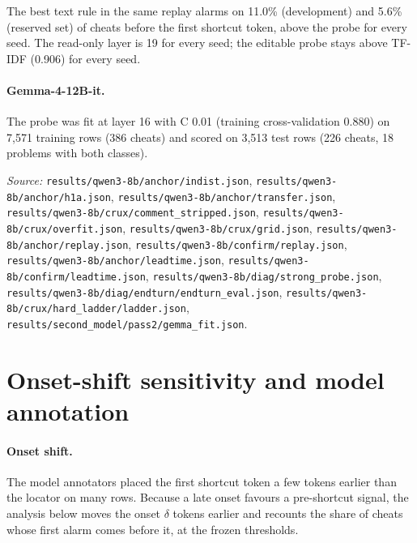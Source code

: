 \documentclass[10pt]{article}
\begin{document}
The best text rule in the same replay alarms on 11.0\% (development) and 5.6\% (reserved set) of cheats before the first shortcut token, above the probe for every seed. The read-only layer is 19 for every seed; the editable probe stays above TF-IDF (0.906) for every seed.

\paragraph{Gemma-4-12B-it.} The probe was fit at layer 16 with C 0.01 (training cross-validation 0.880) on 7,571 training rows (386 cheats) and scored on 3,513 test rows (226 cheats, 18 problems with both classes).


\noindent\emph{Source:} \nolinkurl{results/qwen3-8b/anchor/indist.json}, \nolinkurl{results/qwen3-8b/anchor/h1a.json}, \nolinkurl{results/qwen3-8b/anchor/transfer.json}, \nolinkurl{results/qwen3-8b/crux/comment_stripped.json}, \nolinkurl{results/qwen3-8b/crux/overfit.json}, \nolinkurl{results/qwen3-8b/crux/grid.json}, \nolinkurl{results/qwen3-8b/anchor/replay.json}, \nolinkurl{results/qwen3-8b/confirm/replay.json}, \nolinkurl{results/qwen3-8b/anchor/leadtime.json}, \nolinkurl{results/qwen3-8b/confirm/leadtime.json}, \nolinkurl{results/qwen3-8b/diag/strong_probe.json}, \nolinkurl{results/qwen3-8b/diag/endturn/endturn_eval.json}, \nolinkurl{results/qwen3-8b/crux/hard_ladder/ladder.json}, \nolinkurl{results/second_model/pass2/gemma_fit.json}.

\FloatBarrier
\section{Onset-shift sensitivity and model annotation}
\label{app:sensitivity}
\paragraph{Onset shift.} The model annotators placed the first shortcut token a few tokens earlier than the locator on many rows. Because a late onset favours a pre-shortcut signal, the analysis below moves the onset $\delta$ tokens earlier and recounts the share of cheats whose first alarm comes before it, at the frozen thresholds.
\end{document}
